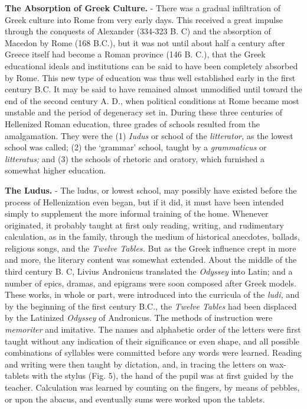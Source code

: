 \documentclass[
]{book}
\begin{document}
\textbf{The Absorption of Greek Culture.} - There was a gradual infiltration of Greek culture into Rome from very early days. This received a great impulse through the conquests of Alexander (334-323 B. C) and the absorption of Macedon by Rome (168 B.C.), but it was not until about half a century after Greece itself had become a Roman province (146 B. C.), that the Greek educational ideals and institutions can be said to have been completely absorbed by Rome. This new type of education was thus well established early in the first century B.C. It may be said to have remained almost unmodified until toward the end of the second century A. D., when political conditions at Rome became most unstable and the period of degeneracy set in. During these three centuries of Hellenized Roman education, three grades of schools resulted from the amalgamation. They were the (1) \emph{Iudus} or school of the \emph{litterator,} as the lowest school was called; (2) the `grammar' school, taught by a \emph{grammaticus} or \emph{litteratus;} and (3) the schools of rhetoric and oratory, which furnished a somewhat higher education.

\textbf{The Ludus.} - The ludus, or lowest school, may possibly have existed before the process of Hellenization even began, but if it did, it must have been intended simply to supplement the more informal training of the home. Whenever originated, it probably taught at first only reading, writing, and rudimentary calculation, as in the family, through the medium of historical anecdotes, ballads, religious songs, and the \emph{Twelve Tables.} But as the Greek influence crept in more and more, the literary content was somewhat extended. About the middle of the third century B. C, Livius Andronicus translated the \emph{Odyssey} into Latin; and a number of epics, dramas, and epigrams were soon composed after Greek models. These works, in whole or part, were introduced into the curricula of the \emph{ludi,} and by the beginning of the first century B.C., the \emph{Twelve Tables} had been displaced by the Latinized \emph{Odyssey} of Andronicus. The methods of instruction were \emph{memoriter} and imitative. The names and alphabetic order of the letters were first taught without any indication of their significance or even shape, and all possible combinations of syllables were committed before any words were learned. Reading and writing were then taught by dictation, and, in tracing the letters on wax-tablets with the stylus (Fig. 5), the hand of the pupil was at first guided by the teacher. Calculation was learned by counting on the fingers, by means of pebbles, or upon the abacus, and eventually sums were worked upon the tablets.
\end{document}
